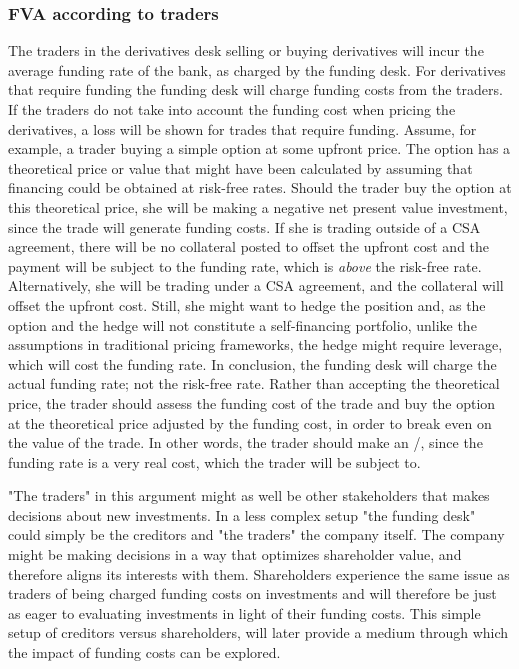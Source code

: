 \documentclass[main.tex]{subfiles}
\begin{document}
        \subsubsection{FVA according to traders}
            The traders in the derivatives desk selling or buying derivatives 
            will incur the average funding rate of the bank, as charged by the funding desk.
            For derivatives that require funding the funding desk will charge funding costs from the traders.
            If the traders do not take into account the funding cost when pricing the derivatives,
            a loss will be shown for trades that require funding.
            Assume, for example, a trader buying a simple option at some upfront price.
            The option has a theoretical price or value that might have been calculated by assuming
            that financing could be obtained at risk-free rates. 
            Should the trader buy the option at this theoretical price, 
            she will be making a negative net present value investment, 
            since the trade will generate funding costs. 
            If she is trading outside of a CSA agreement, there will be no collateral posted
            to offset the upfront cost and the payment will be subject to the
            funding rate, which is \textit{above} the risk-free rate. 
            Alternatively, she will be trading under a CSA agreement,
            and the collateral will offset the upfront cost.
            Still, she might want to hedge the position and, as the option and the hedge
            will not constitute a self-financing portfolio, 
            unlike the assumptions in traditional pricing frameworks,
            the hedge might require leverage, which will cost the funding rate.
            In conclusion, the funding desk will charge the actual funding rate; not the risk-free rate.
            Rather than accepting the theoretical price, the trader should assess the funding cost of the trade 
            and buy the option at the theoretical price adjusted by the funding cost,
            in order to break even on the value of the trade.
            In other words, the trader should make an \FVA/, 
            since the funding rate is a very real cost, which the trader will be subject to.
            
            "The traders" in this argument might as well be other stakeholders that makes decisions about new investments.
            In a less complex setup "the funding desk" could simply be the creditors and "the traders" the company itself.
            The company might be making decisions in a way that optimizes shareholder value,
            and therefore aligns its interests with them.
            Shareholders experience the same issue as traders of being charged funding costs on investments 
            and will therefore be just as eager to evaluating investments in light of their funding costs.
            This simple setup of creditors versus shareholders, 
            will later provide a medium through which the impact of funding costs can be explored.
\end{document}

